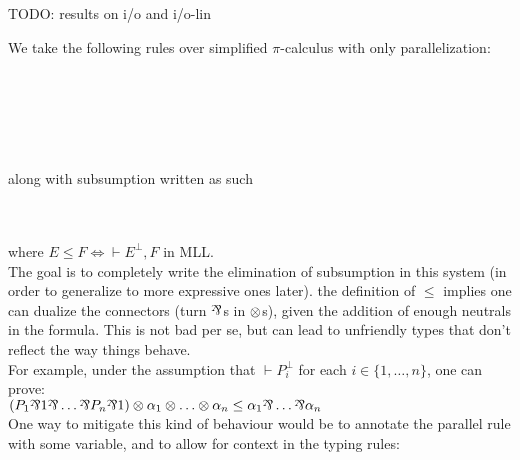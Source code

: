 \documentclass[a4paper,12pt]{book}
\begin{document}
\newpage

TODO: results on i/o and i/o-lin

\newpage

We take the following rules over simplified $\pi$-calculus with only parallelization:\\~\\~\\
\indent\hfill\begin{prooftree}\end{prooftree}\hfill
\begin{prooftree}\end{prooftree}\hfill
\begin{prooftree}\end{prooftree}\hfill~\\~\\~\\
along with subsumption written as such
\begin{prooftree}\end{prooftree}\\~\\
where $E \leq F \iff \vdash E^\bot,F$ in MLL.\\
The goal is to completely write the elimination of subsumption in this system (in order to generalize to more expressive ones later).
\remark the definition of $\leq$ implies one can dualize the connectors (\ie turn $\logpar$s in $\logtensor$s), given the addition of enough neutrals in the formula. This is not bad per se, but can lead to unfriendly types that don't reflect the way things behave.\\
For example, under the assumption that $\vdash P_i^\bot$ for each $i\in\{1,\ldots,n\}$, one can prove:\\
$(P_1 \logpar 1 \logpar \ldots \logpar P_n \logpar 1) \logtensor \alpha_1 \logtensor \ldots \logtensor \alpha_n \leq \alpha_1 \logpar \ldots \logpar \alpha_n$\\
One way to mitigate this kind of behaviour would be to annotate the parallel rule with some variable, and to allow for context in the typing rules:\\~\\~\\
\indent\hfill\begin{prooftree}\end{prooftree}\hfill
\begin{prooftree}\end{prooftree}\hfill
\end{document}
